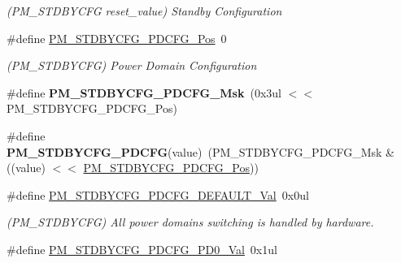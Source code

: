 \begin{DoxyCompactItemize}
\begin{DoxyCompactList}\small\item\em (P\+M\+\_\+\+S\+T\+D\+B\+Y\+C\+F\+G reset\+\_\+value) Standby Configuration \end{DoxyCompactList}\item 
\hypertarget{group___s_a_m_l21___p_m_ga19332dcd50a38dcde23771afb543cfef}{}\#define \hyperlink{group___s_a_m_l21___p_m_ga19332dcd50a38dcde23771afb543cfef}{P\+M\+\_\+\+S\+T\+D\+B\+Y\+C\+F\+G\+\_\+\+P\+D\+C\+F\+G\+\_\+\+Pos}~0\label{group___s_a_m_l21___p_m_ga19332dcd50a38dcde23771afb543cfef}

\begin{DoxyCompactList}\small\item\em (P\+M\+\_\+\+S\+T\+D\+B\+Y\+C\+F\+G) Power Domain Configuration \end{DoxyCompactList}\item 
\hypertarget{group___s_a_m_l21___p_m_ga9433a06d82ba402a8315cd06b95811e9}{}\#define {\bfseries P\+M\+\_\+\+S\+T\+D\+B\+Y\+C\+F\+G\+\_\+\+P\+D\+C\+F\+G\+\_\+\+Msk}~(0x3ul $<$$<$ P\+M\+\_\+\+S\+T\+D\+B\+Y\+C\+F\+G\+\_\+\+P\+D\+C\+F\+G\+\_\+\+Pos)\label{group___s_a_m_l21___p_m_ga9433a06d82ba402a8315cd06b95811e9}

\item 
\hypertarget{group___s_a_m_l21___p_m_gabddeabcbb19ba846edb188212979026c}{}\#define {\bfseries P\+M\+\_\+\+S\+T\+D\+B\+Y\+C\+F\+G\+\_\+\+P\+D\+C\+F\+G}(value)~(P\+M\+\_\+\+S\+T\+D\+B\+Y\+C\+F\+G\+\_\+\+P\+D\+C\+F\+G\+\_\+\+Msk \& ((value) $<$$<$ \hyperlink{group___s_a_m_l21___p_m_ga19332dcd50a38dcde23771afb543cfef}{P\+M\+\_\+\+S\+T\+D\+B\+Y\+C\+F\+G\+\_\+\+P\+D\+C\+F\+G\+\_\+\+Pos}))\label{group___s_a_m_l21___p_m_gabddeabcbb19ba846edb188212979026c}

\item 
\hypertarget{group___s_a_m_l21___p_m_ga3c9a1696d9f36483a6ab4bc45b3b6116}{}\#define \hyperlink{group___s_a_m_l21___p_m_ga3c9a1696d9f36483a6ab4bc45b3b6116}{P\+M\+\_\+\+S\+T\+D\+B\+Y\+C\+F\+G\+\_\+\+P\+D\+C\+F\+G\+\_\+\+D\+E\+F\+A\+U\+L\+T\+\_\+\+Val}~0x0ul\label{group___s_a_m_l21___p_m_ga3c9a1696d9f36483a6ab4bc45b3b6116}

\begin{DoxyCompactList}\small\item\em (P\+M\+\_\+\+S\+T\+D\+B\+Y\+C\+F\+G) All power domains switching is handled by hardware. \end{DoxyCompactList}\item 
\hypertarget{group___s_a_m_l21___p_m_ga39fd06a76e6132ad14ff533d0f3b4398}{}\#define \hyperlink{group___s_a_m_l21___p_m_ga39fd06a76e6132ad14ff533d0f3b4398}{P\+M\+\_\+\+S\+T\+D\+B\+Y\+C\+F\+G\+\_\+\+P\+D\+C\+F\+G\+\_\+\+P\+D0\+\_\+\+Val}~0x1ul\label{group___s_a_m_l21___p_m_ga39fd06a76e6132ad14ff533d0f3b4398}


\end{DoxyCompactItemize}
